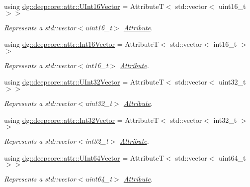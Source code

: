 \begin{DoxyCompactItemize}
using \hyperlink{group___process_attributes_ga5abb768947991d80908ad772dd82ee2c}{dg\+::deepcore\+::attr\+::\+U\+Int16\+Vector} = AttributeT$<$ std\+::vector$<$ uint16\+\_\+t $>$$>$
\begin{DoxyCompactList}\small\item\em Represents a {\ttfamily std\+::vector$<$uint16\+\_\+t$>$} \hyperlink{classdg_1_1deepcore_1_1_attribute}{Attribute}. \end{DoxyCompactList}\item 
using \hyperlink{group___process_attributes_gabdf1a5d0966e5a203c560c36b4e70754}{dg\+::deepcore\+::attr\+::\+Int16\+Vector} = AttributeT$<$ std\+::vector$<$ int16\+\_\+t $>$$>$
\begin{DoxyCompactList}\small\item\em Represents a {\ttfamily std\+::vector$<$int16\+\_\+t$>$} \hyperlink{classdg_1_1deepcore_1_1_attribute}{Attribute}. \end{DoxyCompactList}\item 
using \hyperlink{group___process_attributes_ga1d85384d2aafb87abb9b4512caa28127}{dg\+::deepcore\+::attr\+::\+U\+Int32\+Vector} = AttributeT$<$ std\+::vector$<$ uint32\+\_\+t $>$$>$
\begin{DoxyCompactList}\small\item\em Represents a {\ttfamily std\+::vector$<$uint32\+\_\+t$>$} \hyperlink{classdg_1_1deepcore_1_1_attribute}{Attribute}. \end{DoxyCompactList}\item 
using \hyperlink{group___process_attributes_ga15cc64e18c8f44a864d1844375a7329a}{dg\+::deepcore\+::attr\+::\+Int32\+Vector} = AttributeT$<$ std\+::vector$<$ int32\+\_\+t $>$$>$
\begin{DoxyCompactList}\small\item\em Represents a {\ttfamily std\+::vector$<$int32\+\_\+t$>$} \hyperlink{classdg_1_1deepcore_1_1_attribute}{Attribute}. \end{DoxyCompactList}\item 
using \hyperlink{group___process_attributes_gadd8cc39f67641bf2224cce7f27747c4f}{dg\+::deepcore\+::attr\+::\+U\+Int64\+Vector} = AttributeT$<$ std\+::vector$<$ uint64\+\_\+t $>$$>$
\begin{DoxyCompactList}\small\item\em Represents a {\ttfamily std\+::vector$<$uint64\+\_\+t$>$} \hyperlink{classdg_1_1deepcore_1_1_attribute}{Attribute}. \end{DoxyCompactList}\item 
$$
\end{DoxyCompactItemize}
